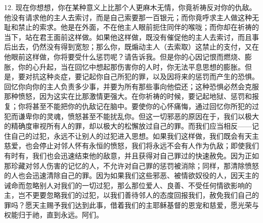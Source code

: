 12. 现在你想想，你在某种意义上比那个人更麻木无情，你竟祈祷反对你的仇敌。他没有请求他的主人去索讨，而是自己索要那一百银元；而你竟呼求主人做这种无耻和禁止的索求。他是在外面，不在他主人眼前扼住同伴的喉咙；而你却在祈祷的当下，站在君王面前这样做。如果他这样做，既没有催促他的主人去索讨，而且事后出去，仍然没有得到宽恕；那么你，既煽动主人（去索取）这禁止的支付，又在他眼前这样做，你将要受什么惩罚呢？请告诉我。但是你的心因记恨而燃烧、膨胀，你的心升起，当在回忆中想起那伤害你的人时，你无法平息思想的膨胀。但是，要对抗这种炎症，要记起你自己所犯的罪，以及因将来的惩罚而产生的恐惧。回忆你向你的主人负责多少事，并要为所有那些事向他偿还；这种恐惧必然会克服那种愤怒，因为这实在比那激情更强大。在你祈祷的时候，要记起地狱、惩罚和报复；你将甚至不能把你的仇敌记在脑中。要使你的心怀痛悔，通过回忆你所犯的过犯而谦卑你的灵魂，愤怒甚至不能扰乱你。但这一切邪恶的原因在于，我们以极大的精确度审视所有人的罪，却以极大的松懈放过自己的罪。而我们应当相反——记住自己的过犯，永远不让别人的过犯进入思想。如果我们这样做，我们既会有天主慈爱，也会停止对邻人怀有永恒的愤怒，我们将永远不会有人作为仇敌；即使我们有时有，我们也会迅速结束他的敌意，并且获得对自己罪过的快速赦免。因为正如那珍藏对邻人伤害的记忆的人，不允许对自己罪的惩罚被消除；同样，那清除愤怒的人也会迅速清除自己的罪。因为如果我们这些邪恶、被情欲奴役的人，因天主的诫命而忽略别人对我们的一切过犯，那么那位爱人、良善、不受任何情欲影响的主，岂不更要忽略我们的过犯，以我们善待邻人的态度回报我们，赦免我们自己的罪吗？愿天主赐予我们达到此事，借着我们的主耶稣基督的恩宠和慈爱，愿光荣与权能归于祂，直到永远。阿们。\par


